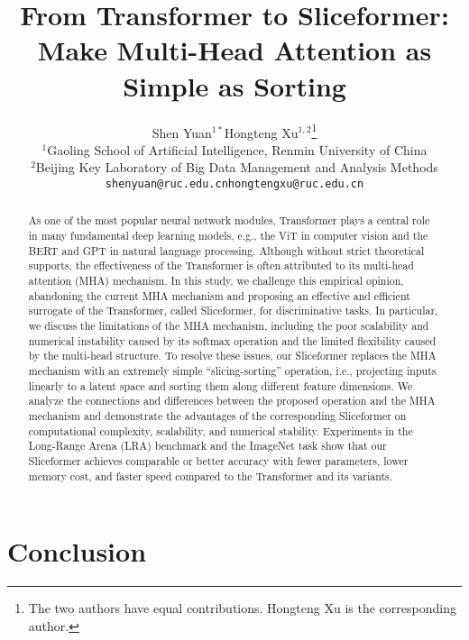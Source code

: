 \documentclass[letterpaper,11pt]{article}
\title{From Transformer to Sliceformer: \\Make Multi-Head Attention as Simple as Sorting}
\author{Shen Yuan$^{1*}$\quad Hongteng Xu$^{1,2}$\thanks{The two authors have equal contributions. Hongteng Xu is the corresponding author.} \\
$^1$Gaoling School of Artificial Intelligence, Renmin University of China\\
$^2$Beijing Key Laboratory of Big Data Management and Analysis Methods\\
\texttt{shenyuan@ruc.edu.cn}\quad \texttt{hongtengxu@ruc.edu.cn}\\
}
\begin{document}
\maketitle

\begin{abstract}
As one of the most popular neural network modules, Transformer plays a central role in many fundamental deep learning models, e.g., the ViT in computer vision and the BERT and GPT in natural language processing.
Although without strict theoretical supports, the effectiveness of the Transformer is often attributed to its multi-head attention (MHA) mechanism. 
In this study, we challenge this empirical opinion, abandoning the current MHA mechanism and proposing an effective and efficient surrogate of the Transformer, called Sliceformer, for discriminative tasks. 
In particular, we discuss the limitations of the MHA mechanism, including the poor scalability and numerical instability caused by its softmax operation and the limited flexibility caused by the multi-head structure. 
To resolve these issues, our Sliceformer replaces the MHA mechanism with an extremely simple ``slicing-sorting'' operation, i.e., projecting inputs linearly to a latent space and sorting them along different feature dimensions. 
We analyze the connections and differences between the proposed operation and the MHA mechanism and demonstrate the advantages of the corresponding Sliceformer on computational complexity, scalability, and numerical stability.
Experiments in the Long-Range Arena (LRA) benchmark and the ImageNet task show that our Sliceformer achieves comparable or better accuracy with fewer parameters, lower memory cost, and faster speed compared to the Transformer and its variants. 
\end{abstract}











\section{Conclusion}





\end{document}
